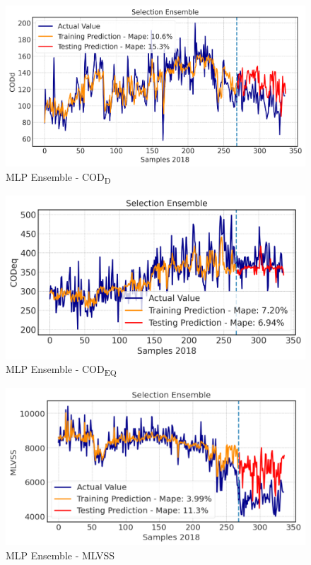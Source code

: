 \begin{figure}[h!]
\centering
\includegraphics[width=\linewidth]{figures/Ch5/CODd-ann2.pdf}
\caption{MLP Ensemble - COD\textsubscript{D}}
\label{f:ann2-codd}
\end{figure}

\begin{figure}[h!]
\centering
\includegraphics[width=\linewidth]{figures/Ch5/CODeq-ann2.pdf}
\caption{MLP Ensemble - COD\textsubscript{EQ}}
\label{f:ann2-codeq}
\end{figure}

\begin{figure}[h!]
\centering
\includegraphics[width=\linewidth]{figures/Ch5/MVLSS-E_ann2.pdf}
\caption{MLP Ensemble - MLVSS}
\label{f:ann2-MLVSS}
\end{figure}

